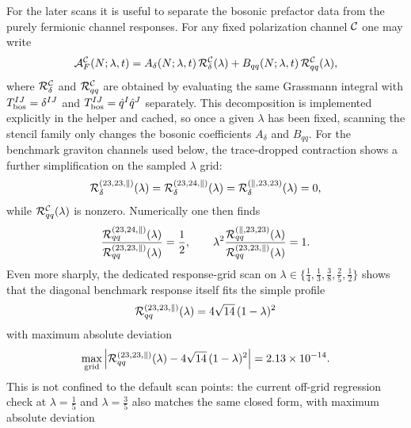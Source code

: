 \documentclass[11pt]{article}
\numberwithin{equation}{section}
\begin{document}
For the later scans it is useful to separate the bosonic prefactor data from the purely fermionic channel responses. For any fixed polarization channel ${\cal C}$ one may write
\begin{equation}
\label{eq:s15-1-038d1}
{\cal A}_F^{\cal C}(N;\lambda,t)
=
A_\delta(N;\lambda,t)\,{\cal R}^{\cal C}_\delta(\lambda)
+
B_{qq}(N;\lambda,t)\,{\cal R}^{\cal C}_{qq}(\lambda),
\end{equation}
where ${\cal R}^{\cal C}_\delta$ and ${\cal R}^{\cal C}_{qq}$ are obtained by evaluating the same Grassmann integral with $T_{\rm bos}^{IJ}=\delta^{IJ}$ and $T_{\rm bos}^{IJ}=\hat q^I\hat q^J$ separately. This decomposition is implemented explicitly in the helper and cached, so once a given $\lambda$ has been fixed, scanning the stencil family only changes the bosonic coefficients $A_\delta$ and $B_{qq}$.
For the benchmark graviton channels used below, the trace-dropped contraction shows a further simplification on the sampled $\lambda$ grid:
\begin{equation}
\label{eq:s15-1-038d2}
{\cal R}^{(23,23,\parallel)}_\delta(\lambda)
=
{\cal R}^{(23,24,\parallel)}_\delta(\lambda)
=
{\cal R}^{(\parallel,23,23)}_\delta(\lambda)
=0,
\end{equation}
while ${\cal R}^{\cal C}_{qq}(\lambda)$ is nonzero. Numerically one then finds
\begin{equation}
\label{eq:s15-1-038d3}
\frac{{\cal R}^{(23,24,\parallel)}_{qq}(\lambda)}
{{\cal R}^{(23,23,\parallel)}_{qq}(\lambda)}
=
\frac12,
\qquad
\lambda^2
\frac{{\cal R}^{(\parallel,23,23)}_{qq}(\lambda)}
{{\cal R}^{(23,23,\parallel)}_{qq}(\lambda)}
=
1.
\end{equation}
Even more sharply, the dedicated response-grid scan on
\(
\lambda\in\{\frac14,\frac13,\frac38,\frac25,\frac12\}
\)
shows that the diagonal benchmark response itself fits the simple profile
\begin{equation}
\label{eq:s15-1-038d3a}
{\cal R}^{(23,23,\parallel)}_{qq}(\lambda)
=
4\sqrt{14}\,(1-\lambda)^2
\end{equation}
with maximum absolute deviation
\begin{equation}
\label{eq:s15-1-038d3b}
\max_{\rm grid}
\left|
{\cal R}^{(23,23,\parallel)}_{qq}(\lambda)
-4\sqrt{14}\,(1-\lambda)^2
\right|
=2.13\times 10^{-14}.
\end{equation}
This is not confined to the default scan points: the current off-grid
regression check at $\lambda=\frac15$ and $\lambda=\frac35$ also matches the
same closed form, with maximum absolute deviation
\end{document}
